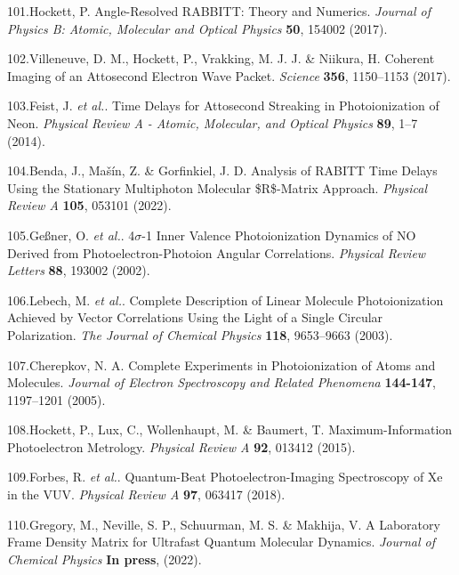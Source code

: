 \documentclass[10pt]{article}
\begin{document}
\label{csl:101}101.Hockett, P. {Angle-Resolved {{RABBITT}}: Theory and Numerics}. \textit{Journal of Physics B: Atomic, Molecular and Optical Physics} \textbf{50}, 154002 (2017).

\label{csl:102}102.Villeneuve, D. M., Hockett, P., Vrakking, M. J. J. \& Niikura, H. {Coherent Imaging of an Attosecond Electron Wave Packet}. \textit{Science} \textbf{356}, 1150–1153 (2017).

\label{csl:103}103.Feist, J. \textit{et al.}. {Time Delays for Attosecond Streaking in Photoionization of Neon}. \textit{Physical Review A - Atomic, Molecular, and Optical Physics} \textbf{89}, 1–7 (2014).

\label{csl:104}104.Benda, J., Ma{\v s}{\'i}n, Z. \& Gorfinkiel, J. D. {Analysis of {{RABITT}} Time Delays Using the Stationary Multiphoton Molecular \${{R}}\$-Matrix Approach}. \textit{Physical Review A} \textbf{105}, 053101 (2022).

\label{csl:105}105.Ge{\ss}ner, O. \textit{et al.}. {4{$\sigma$}-1 {{Inner Valence Photoionization Dynamics}} of {{NO Derived}} from {{Photoelectron}}-{{Photoion Angular Correlations}}}. \textit{Physical Review Letters} \textbf{88}, 193002 (2002).

\label{csl:106}106.Lebech, M. \textit{et al.}. {Complete Description of Linear Molecule Photoionization Achieved by Vector Correlations Using the Light of a Single Circular Polarization}. \textit{The Journal of Chemical Physics} \textbf{118}, 9653–9663 (2003).

\label{csl:107}107.Cherepkov, N. A. {Complete Experiments in Photoionization of Atoms and Molecules}. \textit{Journal of Electron Spectroscopy and Related Phenomena} \textbf{144-147}, 1197–1201 (2005).

\label{csl:108}108.Hockett, P., Lux, C., Wollenhaupt, M. \& Baumert, T. {Maximum-Information Photoelectron Metrology}. \textit{Physical Review A} \textbf{92}, 013412 (2015).

\label{csl:109}109.Forbes, R. \textit{et al.}. {Quantum-Beat Photoelectron-Imaging Spectroscopy of {{Xe}} in the {{VUV}}}. \textit{Physical Review A} \textbf{97}, 063417 (2018).

\label{csl:110}110.Gregory, M., Neville, S. P., Schuurman, M. S. \& Makhija, V. {A {{Laboratory Frame Density Matrix}} for {{Ultrafast Quantum Molecular Dynamics}}}. \textit{Journal of Chemical Physics} \textbf{In press}, (2022).
\end{document}
